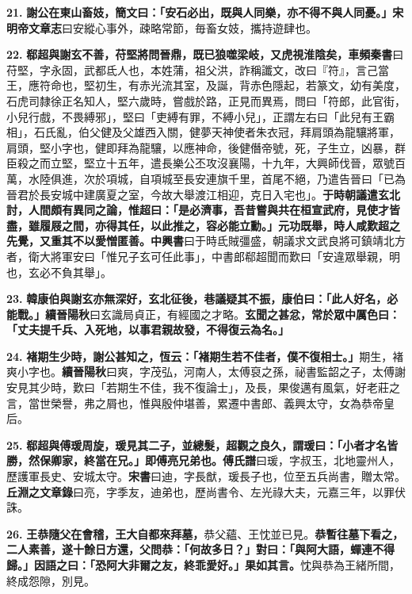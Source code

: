 \textbf{21.} \textbf{謝公在東山畜妓，簡文曰：「安石必出，既與人同樂，亦不得不與人同憂。」}{\footnotesize \textbf{宋明帝文章志}曰安縱心事外，疎略常節，毎畜女妓，攜持遊肆也。}

\textbf{22.} \textbf{郗超與謝玄不善，苻堅將問晉鼎，既已狼噬梁岐，又虎視淮陰矣，}{\footnotesize \textbf{車頻秦書}曰苻堅，字永固，武都氐人也，本姓蒲，祖父洪，詐稱讖文，改曰『符』，言己當王，應符命也，堅初生，有赤光流其室，及誕，背赤色隱起，若篆文，幼有美度，石虎司隸徐正名知人，堅六歲時，嘗戲於路，正見而異焉，問曰「符郎，此官街，小兒行戲，不畏縛邪」，堅曰「吏縛有罪，不縛小兒」，正謂左右曰「此兒有王霸相」，石氏亂，伯父健及父雄西入關，健夢天神使者朱衣冠，拜肩頭為龍驤將軍，肩頭，堅小字也，健即拜為龍驤，以應神命，後健僭帝號，死，子生立，凶暴，群臣殺之而立堅，堅立十五年，遣長樂公丕攻沒襄陽，十九年，大興師伐晉，眾號百萬，水陸俱進，次於項城，自項城至長安連旗千里，首尾不絕，乃遣告晉曰「已為晉君於長安城中建廣夏之室，今故大舉渡江相迎，克日入宅也」。}\textbf{于時朝議遣玄北討，人間頗有異同之論，惟超曰：「是必濟事，吾昔嘗與共在桓宣武府，見使才皆盡，雖履屐之間，亦得其任，以此推之，容必能立勳。」元功既舉，時人咸歎超之先覺，又重其不以愛憎匿善。}{\footnotesize \textbf{中興書}曰于時氐賊彊盛，朝議求文武良將可鎮靖北方者，衛大將軍安曰「惟兄子玄可任此事」，中書郎郗超聞而歎曰「安違眾舉親，明也，玄必不負其舉」。}

\textbf{23.} \textbf{韓康伯與謝玄亦無深好，玄北征後，巷議疑其不振，康伯曰：「此人好名，必能戰。」}{\footnotesize \textbf{續晉陽秋}曰玄識局貞正，有經國之才略。}\textbf{玄聞之甚忿，常於眾中厲色曰：「丈夫提千兵、入死地，以事君親故發，不得復云為名。」}

\textbf{24.} \textbf{褚期生少時，謝公甚知之，恆云：「褚期生若不佳者，僕不復相士。」}{\footnotesize 期生，褚爽小字也。\textbf{續晉陽秋}曰爽，字茂弘，河南人，太傅裒之孫，祕書監韶之子，太傅謝安見其少時，歎曰「若期生不佳，我不復論士」，及長，果俊邁有風氣，好老莊之言，當世榮譽，弗之屑也，惟與殷仲堪善，累遷中書郎、義興太守，女為恭帝皇后。}

\textbf{25.} \textbf{郗超與傅瑗周旋，瑗見其二子，並總髮，超觀之良久，謂瑗曰：「小者才名皆勝，然保卿家，終當在兄。」即傅亮兄弟也。}{\footnotesize \textbf{傅氏譜}曰瑗，字叔玉，北地靈州人，歷護軍長史、安城太守。\textbf{宋書}曰迪，字長猷，瑗長子也，位至五兵尚書，贈太常。\textbf{丘淵之文章錄}曰亮，字季友，迪弟也，歷尚書令、左光祿大夫，元嘉三年，以罪伏誅。}

\textbf{26.} \textbf{王恭隨父在會稽，王大自都來拜墓，}{\footnotesize 恭父蘊、王忱並已見。}\textbf{恭暫往墓下看之，二人素善，遂十餘日方還，父問恭：「何故多日？」對曰：「與阿大語，蟬連不得歸。」因語之曰：「恐阿大非爾之友，終乖愛好。」果如其言。}{\footnotesize 忱與恭為王緒所間，終成怨隙，別見。}

